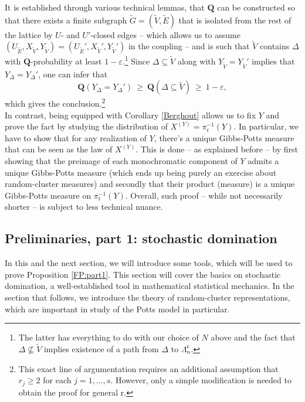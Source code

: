 \documentclass[12pt]{article}
\newcommand{\Q}{\mathbf{Q}}
\renewcommand{\r}{\mathrm{r}}
\newcommand{\1}{\mathbbm{1}}
\renewcommand{\c}{\mathsf{c}}
\newcommand{\5}{\vspace{0.5cm}}
\renewcommand{\tilde}{\widetilde}
\theoremstyle{definition}
\begin{document}
It is established through various technical lemmas, that $\Q$ can be constructed so that there exists a finite subgraph $\tilde{G}=(\tilde{V},\tilde{E})$ that is isolated from the rest of the lattice by $U$- and $U'$-closed edges -- which allows us to assume $(U_{\tilde{E}},X_{\tilde{V}},Y_{\tilde{V}})=(U_{\tilde{E}}',X_{\tilde{V}}',Y_{\tilde{V}}')$ in the coupling -- and is such that $\tilde{V}$ contains $\Delta$ with $\Q$-probability at least $1-\varepsilon$.\footnote{The latter has everything to do with our choice of $N$ above and the fact that $\Delta\not\subseteq\tilde{V}$ implies existence of a path from $\Delta$ to $\Lambda_n^\c$.} Since $\Delta\subseteq\tilde{V}$ along with $Y_{\tilde{V}}=Y_{\tilde{V}}'$ implies that $Y_{\Delta}=Y_{\Delta}'$, one can infer that 
$$\Q(Y_{\Delta}=Y_{\Delta}') ~\geq~ \Q(\Delta\subseteq\tilde{V}) ~\geq~ 1-\varepsilon,$$
which gives the conclusion.\footnote{This exact line of argumentation requires an additional assumption that $r_j\geq 2$ for each $j=1,\ldots,s$. However, only a simple modification is needed to obtain the proof for general $\r$.} \\

In contrast, being equipped with Corollary \ref{Berghout} allows us to fix $Y$ and prove the fact by studying the distribution of $X^{(Y)}=\pi_\r^{-1}(Y)$. In particular, we have to show that for any realization of $Y$, there's a unique Gibbs-Potts measure that can be seen as the law of $X^{(Y)}$. This is done -- as explained before -- by first showing that the preimage of each monochromatic component of $Y$ admits a unique Gibbs-Potts measure (which ends up being purely an exercise about random-cluster measures) and secondly that their product (measure) is a unique Gibbs-Potts measure on $\pi_\r^{-1}(Y)$. Overall, such proof -- while not necessarily shorter -- is subject to less technical nuance.


\subsection{Preliminaries, part 1: stochastic domination}

In this and the next section, we will introduce some tools, which will be used to prove Proposition \ref{FP:part1}. This section will cover the basics on stochastic domination, a well-established tool in mathematical statistical mechanics. In the section that follows, we introduce the theory of random-cluster representations, which are important in study of the Potts model in particular. \\
\end{document}
